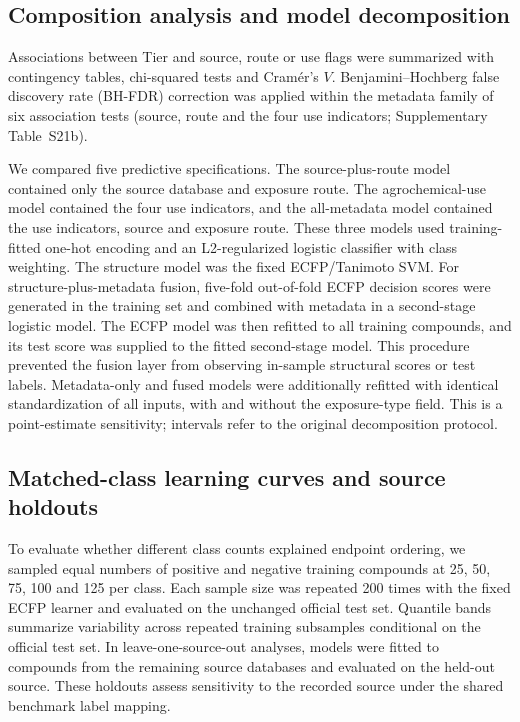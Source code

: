 \documentclass{ieeeaccess}
\begin{document}
\subsection{Composition analysis and model decomposition}
Associations between Tier and source, route or use flags were summarized with contingency tables, chi-squared tests and Cram\'{e}r's \(V\). Benjamini--Hochberg false discovery rate (BH-FDR) correction was applied within the metadata family of six association tests (source, route and the four use indicators; Supplementary Table~S21b)\cite{Benjamini1995}.

We compared five predictive specifications. The source-plus-route model contained only the source database and exposure route. The agrochemical-use model contained the four use indicators, and the all-metadata model contained the use indicators, source and exposure route. These three models used training-fitted one-hot encoding and an L2-regularized logistic classifier with class weighting. The structure model was the fixed ECFP/Tanimoto SVM. For structure-plus-metadata fusion, five-fold out-of-fold ECFP decision scores were generated in the training set and combined with metadata in a second-stage logistic model. The ECFP model was then refitted to all training compounds, and its test score was supplied to the fitted second-stage model. This procedure prevented the fusion layer from observing in-sample structural scores or test labels. Metadata-only and fused models were additionally refitted with identical standardization of all inputs, with and without the exposure-type field. This is a point-estimate sensitivity; intervals refer to the original decomposition protocol.

\subsection{Matched-class learning curves and source holdouts}
To evaluate whether different class counts explained endpoint ordering, we sampled equal numbers of positive and negative training compounds at 25, 50, 75, 100 and 125 per class. Each sample size was repeated 200 times with the fixed ECFP learner and evaluated on the unchanged official test set. Quantile bands summarize variability across repeated training subsamples conditional on the official test set. In leave-one-source-out analyses, models were fitted to compounds from the remaining source databases and evaluated on the held-out source. These holdouts assess sensitivity to the recorded source under the shared benchmark label mapping.
\end{document}
